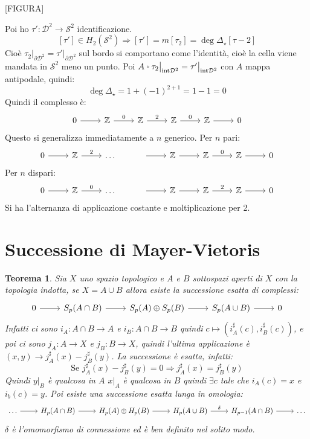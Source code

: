 \documentclass[10pt, twoside=false, x11names]{scrbook}
\newtheorem{theorem}{Teorema}[section]
\newcommand{\Z}{\mathbb{Z}}
\newcommand{\Sph}[1][]{\mathcal{S}^#1}
\newcommand{\Disk}[1][]{\mathcal{D}^#1}
\let\latexcirc=\circ
\newcommand{\ccirc}{\mathbin{\mathchoice
  {\xcirc\scriptstyle}
  {\xcirc\scriptstyle}
  {\xcirc\scriptscriptstyle}
  {\xcirc\scriptscriptstyle}
}}
\newcommand{\xcirc}[1]{\vcenter{\hbox{$#1\latexcirc$}}}
\let\circ\ccirc
\begin{document}
[FIGURA]

Poi ho $ \tau' \colon \Disk{2} \to \Sph{2} $ identificazione.
\[
  [\tau'] \in H_2(\Sph{2}) \Rightarrow [\tau'] = m[\tau_2] = \deg{\Delta_\star}[\tau-2]
\]
Cioè
$ \tau_2 \big \lvert_{\partial \Disk{2}} = \tau' \big \lvert_{\partial \Disk{2}} $ sul bordo si
comportano come l'identità, cioè la cella viene mandata in $ \Sph{2} $ meno un
punto. Poi $ A \circ \tau_2 \big \lvert_{\mathrm{int} \Disk{2}} = \tau' \big \lvert_{\mathrm{int} \Disk{2}} $
con $ A $ mappa antipodale, quindi:
\[
  \deg{\Delta_\star} = 1 + (-1)^{2 + 1} = 1 - 1 = 0
\]
Quindi il complesso è:
\[
  \begin{tikzcd}
    0 \rar & \Z \rar{0} & \Z \rar{2} & \Z \rar{0}  & \Z \rar & 0
  \end{tikzcd}
\]
Questo si generalizza immediatamente a $ n $ generico.
Per $ n $ pari:
\[
  \begin{tikzcd}
    0 \rar & \Z \rar{2} & \dots & \rar & \Z \rar & \Z \rar{0} & \Z \rar & 0
  \end{tikzcd}
\]
Per $ n $ dispari:
\[
  \begin{tikzcd}
    0 \rar & \Z \rar{0} & \dots & \rar & \Z \rar & \Z \rar{2} & \Z \rar & 0
  \end{tikzcd}
\]
Si ha l'alternanza di applicazione costante e moltiplicazione per 2.

\section{Successione di Mayer-Vietoris}

\begin{theorem}
  Sia $ X $ uno spazio topologico e $ A $ e $ B $ sottospazi aperti di $ X $ con la
  topologia indotta, se $ X = A \cup B $ allora esiste la successione esatta di complessi:
  \[
    \begin{tikzcd}
      0 \rar & S_p(A \cap B) \rar & S_p(A) \oplus S_p(B) \rar & S_p(A \cup B) \rar & 0
    \end{tikzcd}
  \]
  Infatti ci sono $ i_A \colon A \cap B \to A $ e $ i_B \colon A \cap B \to B $ quindi
  $ c \mapsto (i_A^\sharp (c), i_B^\sharp (c)) $, e poi ci sono $ j_A \colon A \to X $ e $ j_B \colon B \to X $,
  quindi l'ultima applicazione è $ (x,y) \to j_A^\sharp(x) - j_B^\sharp(y) $.
  La successione è esatta, infatti:
  \[
    \text{Se }  j_A^\sharp(x) - j_B^\sharp(y) = 0 \Rightarrow  j_A^\sharp(x) = j_B^\sharp(y)
  \]
  Quindi $ y \lvert_B $ è qualcosa in $ A $ $ x \lvert_A $ è qualcosa in $ B $
  quindi $ \exists c $ tale che $ i_A(c) = x $ e $ i_b(c) = y $.
  Poi esiste una successione esatta lunga in omologia:
  \[
    \begin{tikzcd}
      \dots \rar & H_p(A \cap B) \rar & H_p(A) \oplus H_p(B) \rar & H_p(A \cup B) \rar{\delta} & H_{p-1}(A \cap B) \rar & \dots
    \end{tikzcd}
  \]
  $ \delta $ è l'omomorfismo di connessione ed è ben definito nel solito modo.
\end{theorem}
\end{document}
